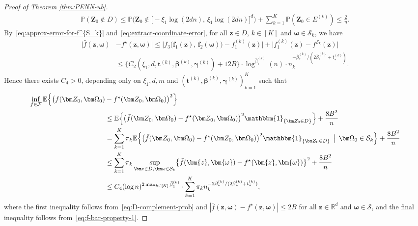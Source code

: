 \documentclass[12pt]{article}
\begin{document}
\begin{proof}[Proof of Theorem \ref{thm:PENN-ub}]
    \begin{align}
        \mathbb{P}(\bm Z_0 \notin D) \leq \mathbb{P}\bigl(\bm Z_0 \notin \bigl[-\xi_1\log(2dn),\,\xi_1\log(2dn)\bigr]^d \bigr) + \sum_{k=1}^K \mathbb{P}(\bm Z_0 \in E^{(k)}) \leq \frac{2}{n}. \label{eq:D-complement-prob}
    \end{align}
    By~\eqref{eq:approx-error-for-f^{S_k}} and~\eqref{eq:extract-coordinate-error}, for all $\bm z \in D$, $k\in[K]$ and $\bm\omega \in \mathcal{S}_k$, we have 
    \begin{align}
        \bigl|\bar{f}(\bm{z},\bm{\omega}) &- f^{\star}(\bm{z},\bm{\omega})\bigr| \leq \bigl|f_3 \bigl( \bm{f}_1(\bm{z}),\, \bm f_2(\bm{\omega}) \bigr) - f_1^{(k)}(\bm{z}) \bigr| +  \bigl| f_1^{(k)}(\bm{z}) - f^{\mathcal{S}_k}(\bm{z})\bigr|\nonumber\\
        &\leq \bigl\{C_2(\xi_1, d, \bm t^{(k)}, \bm \beta^{(k)}, \bm \gamma^{(k)}) + 12B \bigr\} \cdot \log^{\bar{\beta}_1^{(k)}}(n) \cdot n_k^{-\bar\beta^{(k)}_* / (2\bar\beta^{(k)}_* + t^{(k)}_*)}. \label{eq:f-bar-property-1}
    \end{align}
    Hence there exists $C_4>0$, depending only on $\xi_1,d,m$ and $(\bm t^{(k)}, \bm \beta^{(k)}, \bm \gamma^{(k)})_{k=1}^K$ such that
    \begin{align}
        \inf_{f\in\mathcal{F}} \mathbb{E}\Bigl\{ \bigl(f(\bm Z_0,\bm \Omega_0) &- f^{\star}(\bm Z_0,\bm \Omega_0)\bigr)^2 \Bigr\}\nonumber\\
        &\leq \mathbb{E}\Bigl\{ \bigl(\bar{f}(\bm Z_0,\bm \Omega_0) - f^{\star}(\bm Z_0,\bm \Omega_0)\bigr)^2 \mathbbm{1}_{\{\bm Z_0 \in D\}} \Bigr\} + \frac{8B^2}{n}\nonumber\\
        &= \sum_{k=1}^K \pi_k \mathbb{E}\Bigl\{ \bigl(\bar{f}(\bm Z_0,\bm \Omega_0) - f^{\star}(\bm Z_0,\bm \Omega_0)\bigr)^2 \mathbbm{1}_{\{\bm Z_0 \in D\}} \,\bigm|\, \bm\Omega_0 \in \mathcal{S}_k \Bigr\}  + \frac{8B^2}{n}\nonumber\\
        &\leq \sum_{k=1}^K \pi_k \sup_{\bm z\in D, \bm\omega\in\mathcal{S}_k} \bigl\{\bar{f}(\bm{z},\bm{\omega}) - f^{\star}(\bm{z},\bm{\omega})\bigr\}^2  + \frac{8B^2}{n}\nonumber\\
        &\leq C_4 (\log n)^{2\max_{k\in[K]}\bar{\beta}_1^{(k)}} \cdot \sum_{k=1}^K \pi_k n_k^{-2\bar\beta^{(k)}_* / (2\bar\beta^{(k)}_* + t^{(k)}_*)}, \label{eq:approx-error}
    \end{align}
    where the first inequality follows from~\eqref{eq:D-complement-prob} and $|\bar{f}(\bm z,\bm\omega) - f^{\star}(\bm z,\bm\omega)| \leq 2B$ for all $\bm z \in \mathbb{R}^d$ and $\bm\omega\in\mathcal{S}$, and the final inequality follows from~\eqref{eq:f-bar-property-1}.

\end{proof}
\end{document}
